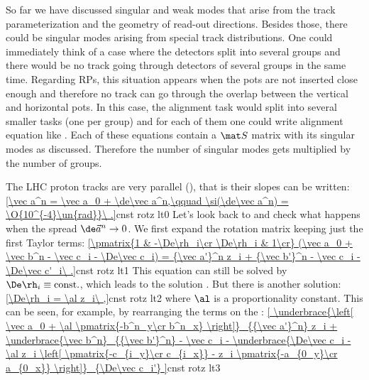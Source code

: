 

So far we have discussed singular and weak modes that arise from the track parameterization and the geometry of read-out directions. Besides those, there could be singular modes arising from special track distributions. One could immediately think of a case where the detectors split into several groups and there would be no track going through detectors of several groups in the same time. Regarding RPs, this situation appears when the pots are not inserted close enough and therefore no track can go through the overlap between the vertical and horizontal pots. In this case, the alignment task would split into several smaller tasks (one per group) and for each of them one could write alignment equation like . Each of these equations contain a $\mat S$ matrix with its singular modes as discussed. Therefore the number of singular modes gets multiplied by the number of groups.

The LHC proton tracks are very parallel (), that is their slopes can be written:
\eqref{\vec a^n = \vec a_0 + \de\vec a^n,\qquad \si(\de\vec a^n) = \O{10^{-4}\un{rad}}\ .}{cnst rotz lt0}
 Let's look back to  and check what happens when the spread $\de\vec a^n\to 0$. We first expand the rotation matrix keeping just the first Taylor terms:
\eqref{\pmatrix{1 & -\De\rh_i\cr \De\rh_i & 1\cr} (\vec a_0 + \vec b^n - \vec c_i - \De\vec c_i) = {\vec a'}^n z_i + {\vec b'}^n - \vec c_i - \De\vec c'_i\ .}{cnst rotz lt1}
This equation can still be solved by $\De\rh_i\equiv\hbox{const.}$, which leads to the solution . But there is another solution:
\eqref{\De\rh_i = \al z_i\ ,}{cnst rotz lt2}
where $\al$ is a proportionality constant. This can be seen, for example, by rearranging the terms on the \lhs{}:
\eqref{
\underbrace{\left[ \vec a_0 + \al \pmatrix{-b^n_y\cr b^n_x} \right]}_{{\vec a'}^n} z_i
	+ \underbrace{\vec b^n}_{{\vec b'}^n}
	- \vec c_i
	- \underbrace{\De\vec c_i - \al z_i \left[ \pmatrix{-c_{i_y}\cr c_{i_x}} - z_i \pmatrix{-a_{0_y}\cr a_{0_x}} \right]}_{\De\vec c_i'}
}{cnst rotz lt3}

